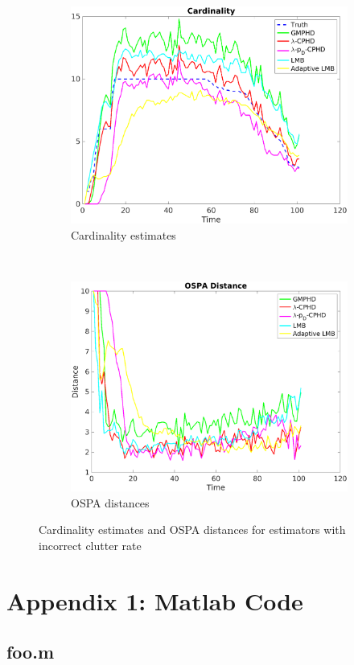 \documentclass{article}
\begin{document}
\begin{figure}[H]
  \centering
  \begin{subfigure}[t]{0.49\textwidth}
    \centering
    \includegraphics[width=1\linewidth]{low_clutter/cardinality.png}
    \caption{Cardinality estimates}
  \end{subfigure}%
  ~ 
  \begin{subfigure}[t]{0.49\textwidth}
    \centering
    \includegraphics[width=1\linewidth]{low_clutter/ospa.png}
    \caption{OSPA distances}
  \end{subfigure}
\caption{Cardinality estimates and OSPA distances for estimators with incorrect clutter rate}
\end{figure}

\clearpage
\pagebreak
\printbibliography

\section*{Appendix 1: Matlab Code}
\subsection*{foo.m}
\begin{lstlisting}[language=Matlab]
\end{lstlisting}
\end{document}
